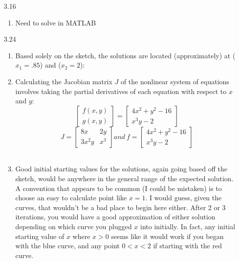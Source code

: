 \documentclass[11pt,a4paper,draft]{article}
\begin{document}
\begin{itemize}
		\item [3.16]
			\begin{enumerate}
				\item Need to solve in MATLAB
			\end{enumerate}
		
		\item [3.24] $ $
			\begin{enumerate} [label={\alph*)}]
				\item Based solely on the sketch, the solutions are located (approximately) at ($x_1=.85$) and ($x_2=2$):\\ 
				
				\item Calculating the Jacobian matrix $J$ of the nonlinear system of equations involves taking the partial derivatives of each equation with respect to $x$ and $y$:
				$$\begin{bmatrix} f(x,y) \\ g(x,y) \end{bmatrix} = \begin{bmatrix} 4x^2+y^2-16 \\ x^3y-2 \end{bmatrix}$$
				$$J = \begin{bmatrix} 8x & 2y \\ 3x^2y & x^3 \end{bmatrix} and\ f = \begin{bmatrix} 4x^2+y^2-16 \\ x^3y-2 \end{bmatrix} $$\
				
				\item Good initial starting values for the solutions, again going based off the sketch, would be anywhere in the general range of the expected solution. A convention that appears to be common (I could be mistaken) is to choose an easy to calculate point like $x=1$. I would guess, given the curves, that wouldn't be a bad place to begin here either. After 2 or 3 iterations, you would have a good approximation of either solution depending on which curve you plugged $x$ into initially. In fact, any initial starting value of $x$ where $x > 0$ seems like it would work if you began with the blue curve, and any point $0 < x < 2$ if starting with the red curve.
				

\end{enumerate}
\end{itemize}
\end{document}

